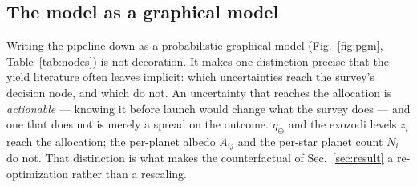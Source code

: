 \documentclass[11pt,a4paper]{article}
\begin{document}
\subsection{The model as a graphical model}

Writing the pipeline down as a probabilistic graphical model (Fig.~\ref{fig:pgm},
Table~\ref{tab:nodes}) is not decoration. It makes one distinction precise that the yield
literature often leaves implicit: which uncertainties reach the survey's decision node, and which
do not. An uncertainty that reaches the allocation is \emph{actionable} --- knowing it before
launch would change what the survey does --- and one that does not is merely a spread on the
outcome. $\eta_\oplus$ and the exozodi levels $z_i$ reach the allocation; the per-planet albedo
$A_{ij}$ and the per-star planet count $N_i$ do not. That distinction is what makes the
counterfactual of Sec.~\ref{sec:result} a re-optimization rather than a rescaling.
\end{document}
